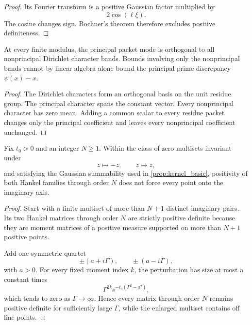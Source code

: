 \documentclass{aomart}
\theoremstyle{definition}
\theoremstyle{remark}
\begin{document}
\begin{proof}
Its Fourier transform is a positive Gaussian factor multiplied by
\[
 2\cos(\ell\xi).
\]
The cosine changes sign. Bochner's theorem therefore excludes positive definiteness.
\end{proof}

\begin{proposition}\label{prop:principal_mode_separation}
At every finite modulus, the principal packet mode is orthogonal to all nonprincipal Dirichlet character bands. Bounds involving only the nonprincipal bands cannot by linear algebra alone bound the principal prime discrepancy \(\psi(x)-x\).
\end{proposition}

\begin{proof}
The Dirichlet characters form an orthogonal basis on the unit residue group. The principal character spans the constant vector. Every nonprincipal character has zero mean. Adding a common scalar to every residue packet changes only the principal coefficient and leaves every nonprincipal coefficient unchanged.
\end{proof}

\begin{proposition}\label{prop:no_finite_hankel}
Fix \(t_0>0\) and an integer \(N\geq1\). Within the class of zero multisets invariant under
\[
 z\longmapsto-z,
 \qquad
 z\longmapsto\overline z,
\]
and satisfying the Gaussian summability used in \cref{prop:kernel_basic}, positivity of both Hankel families through order \(N\) does not force every point onto the imaginary axis.
\end{proposition}

\begin{proof}
Start with a finite multiset of more than \(N+1\) distinct imaginary pairs. Its two Hankel matrices through order \(N\) are strictly positive definite because they are moment matrices of a positive measure supported on more than \(N+1\) positive points.

Add one symmetric quartet
\[
 \pm(a+i\Gamma),
 \qquad
 \pm(a-i\Gamma),
\]
with \(a>0\). For every fixed moment index \(k\), the perturbation has size at most a constant times
\[
 \Gamma^{2k}e^{-t_0(\Gamma^2-a^2)},
\]
which tends to zero as \(\Gamma\to\infty\). Hence every matrix through order \(N\) remains positive definite for sufficiently large \(\Gamma\), while the enlarged multiset contains off line points.
\end{proof}
\end{document}
